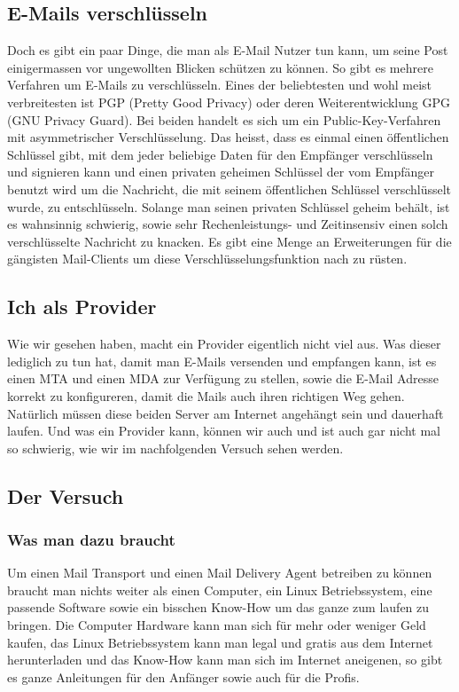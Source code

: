 \subsection{E-Mails verschlüsseln}
Doch es gibt ein paar Dinge, die man als E-Mail Nutzer tun kann, um seine Post einigermassen vor ungewollten Blicken schützen zu können.
So gibt es mehrere Verfahren um E-Mails zu verschlüsseln. Eines der beliebtesten und wohl meist verbreitesten ist PGP (Pretty Good Privacy) oder deren Weiterentwicklung GPG (GNU Privacy Guard).
Bei beiden handelt es sich um ein Public-Key-Verfahren mit asymmetrischer Verschlüsselung. Das heisst, dass es einmal einen öffentlichen Schlüssel gibt, mit dem jeder beliebige Daten für den Empfänger verschlüsseln und signieren kann und einen privaten geheimen Schlüssel der vom Empfänger benutzt wird um die Nachricht, die mit seinem öffentlichen Schlüssel verschlüsselt wurde, zu entschlüsseln.
Solange man seinen privaten Schlüssel geheim behält, ist es wahnsinnig schwierig, sowie sehr Rechenleistungs- und Zeitinsensiv einen solch verschlüsselte Nachricht zu knacken.
Es gibt eine Menge an Erweiterungen für die gängisten Mail-Clients um diese Verschlüsselungsfunktion nach zu rüsten.
\subsection{Ich als Provider}
Wie wir gesehen haben, macht ein Provider eigentlich nicht viel aus. Was dieser lediglich zu tun hat, damit man E-Mails versenden und empfangen kann, ist es einen MTA und einen MDA zur Verfügung zu stellen, sowie die E-Mail Adresse korrekt zu konfigureren, damit die Mails auch ihren richtigen Weg gehen. Natürlich müssen diese beiden Server am Internet angehängt sein und dauerhaft laufen.
Und was ein Provider kann, können wir auch und ist auch gar nicht mal so schwierig, wie wir im nachfolgenden Versuch sehen werden.
\subsection{Der Versuch}
\subsubsection{Was man dazu braucht}
Um einen Mail Transport und einen Mail Delivery Agent betreiben zu können braucht man nichts weiter als einen Computer, ein Linux Betriebssystem, eine passende Software sowie ein bisschen Know-How um das ganze zum laufen zu bringen. Die Computer Hardware kann man sich für mehr oder weniger Geld kaufen, das Linux Betriebssystem kann man legal und gratis aus dem Internet herunterladen und das Know-How kann man sich im Internet aneigenen, so gibt es ganze Anleitungen für den Anfänger sowie auch für die Profis.

